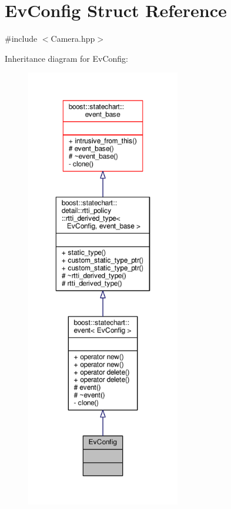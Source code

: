 \hypertarget{struct_ev_config}{}\section{Ev\+Config Struct Reference}
\label{struct_ev_config}


{\ttfamily \#include $<$Camera.\+hpp$>$}



Inheritance diagram for Ev\+Config\+:
\nopagebreak
\begin{figure}[H]
\begin{center}
\leavevmode
\includegraphics[height=550pt]{struct_ev_config__inherit__graph}
\end{center}
\end{figure}



